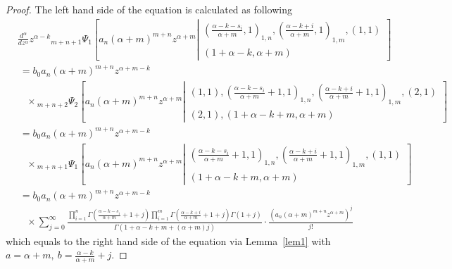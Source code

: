 \documentclass[10pt,a4paper]{amsart}
\begin{document}
\begin{proof}
   The left hand side of the equation is calculated as following
    \begin{align*}
   &\frac{d^{\alpha}}{dz
^{\alpha}}z^{\alpha-k} {}_{m+n+1}\Psi_1
\left[a_{n}(\alpha+m)^{m+n}z^{\alpha+m}\left|\begin{matrix}(
\frac{\alpha-k-s_i}{\alpha+m} ,1)_{1,n},(\frac{\alpha-k+i}{\alpha+m},1)_{1,m},( 1 , 1 )\\ 
( 1+\alpha-k , \alpha+m ) \end{matrix}\right.\right]\\
&~ =b_0a_n(\alpha+m)^{m+n}z^{\alpha+m-k}\\
&~~~~\times{}_{m+n+2}\Psi_2
\left[a_{n}(\alpha+m)^{m+n}z^{\alpha+m}\left|\begin{matrix}( 1 , 1) , (
\frac{\alpha-k-s_i}{\alpha+m}+1 ,1)_{1,n},(\frac{\alpha-k+i}{\alpha+m}+1,1)_{1,m},  ( 2 , 1 )\\ 
( 2 , 1),( 1+\alpha-k+m , \alpha+m ) \end{matrix}\right.\right]\\
&~ =b_0a_n(\alpha+m)^{m+n}z^{\alpha+m-k}\\
&~~~~\times {}_{m+n+1}\Psi_1
\left[a_{n}(\alpha+m)^{m+n}z^{\alpha+m}\left|\begin{matrix} (
\frac{\alpha-k-s_i}{\alpha+m}+1 ,1)_{1,n},(\frac{\alpha-k+i}{\alpha+m}+1,1)_{1,m},  ( 1 , 1 )\\ ( 1+\alpha-k+m , \alpha+m ) \end{matrix}\right.\right]\\
&~ =b_0a_n(\alpha+m)^{m+n}z^{\alpha+m-k}\\
&~~~~\times\sum \limits_{j=0}^{\infty}\frac{ \prod\limits_{i=1}^{n}\Gamma
\left( \frac{\alpha-k-s_i}{\alpha+m}+1+j\right)  \prod\limits_{i=1}^{m}\Gamma  \left(
\frac{\alpha-k+i}{\alpha+m}+1+j\right) \Gamma(1+j)  }{\Gamma(1+\alpha-k+m+(\alpha+m)j)}\cdot\frac{
\left(a_{n}(\alpha+m)^{m+n}z^{\alpha+m}\right)^{j}}{j!}
\end{align*}
which equals to the right hand side of the equation via Lemma~\ref{lem1} with $a=\alpha+m,~b=\frac{\alpha-k}{\alpha+m}+j$.
\end{proof}
\end{document}
